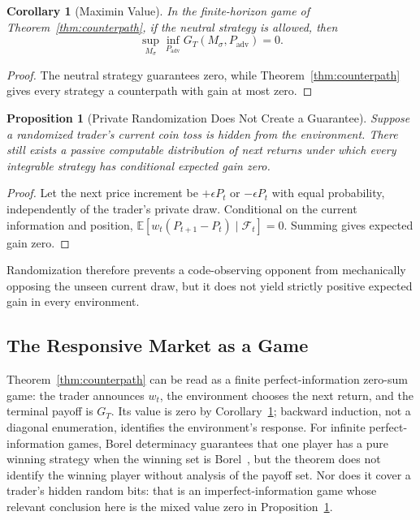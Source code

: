 \documentclass[aps,pra,reprint,superscriptaddress,amsmath,amssymb,floatfix]{revtex4-2}
\theoremstyle{plain}
\newtheorem{corollary}[theorem]{Corollary}
\newtheorem{proposition}[theorem]{Proposition}
\theoremstyle{definition}
\theoremstyle{remark}
\begin{document}
\begin{corollary}[Maximin Value]
  \label{cor:maximin}
  In the finite-horizon game of Theorem~\ref{thm:counterpath}, if the neutral
  strategy is allowed, then
  \[
    \sup_{M_\sigma}\inf_{P_{\mathrm{adv}}}G_T(M_\sigma,P_{\mathrm{adv}})=0.
  \]
\end{corollary}

\begin{proof}
The neutral strategy guarantees zero, while
Theorem~\ref{thm:counterpath} gives every strategy a counterpath with gain at
most zero.
\end{proof}

\begin{proposition}[Private Randomization Does Not Create a Guarantee]
  \label{prop:randomized}
  Suppose a randomized trader's current coin toss is hidden from the
  environment. There still exists a passive computable distribution of next
  returns under which every integrable strategy has conditional expected gain
  zero.
\end{proposition}

\begin{proof}
Let the next price increment be \(+\epsilon P_t\) or \(-\epsilon P_t\) with
equal probability, independently of the trader's private draw. Conditional on
the current information and position,
\(\mathbb{E}[w_t(P_{t+1}-P_t)\mid\mathcal{F}_t]=0\).
Summing gives expected gain zero.
\end{proof}

Randomization therefore prevents a code-observing opponent from mechanically
opposing the unseen current draw, but it does not yield strictly positive
expected gain in every environment.

\subsection{The Responsive Market as a Game}

Theorem~\ref{thm:counterpath} can be read as a finite perfect-information
zero-sum game: the trader announces \(w_t\), the environment chooses the next
return, and the terminal payoff is \(G_T\). Its value is zero by
Corollary~\ref{cor:maximin}; backward induction, not a diagonal enumeration,
identifies the environment's response. For infinite perfect-information games,
Borel determinacy guarantees that one player has a pure winning strategy when
the winning set is Borel~\cite{Martin1975}, but the theorem does not identify
the winning player without analysis of the payoff set. Nor does it cover a
trader's hidden random bits: that is an imperfect-information game whose
relevant conclusion here is the mixed value zero in
Proposition~\ref{prop:randomized}.
\end{document}
